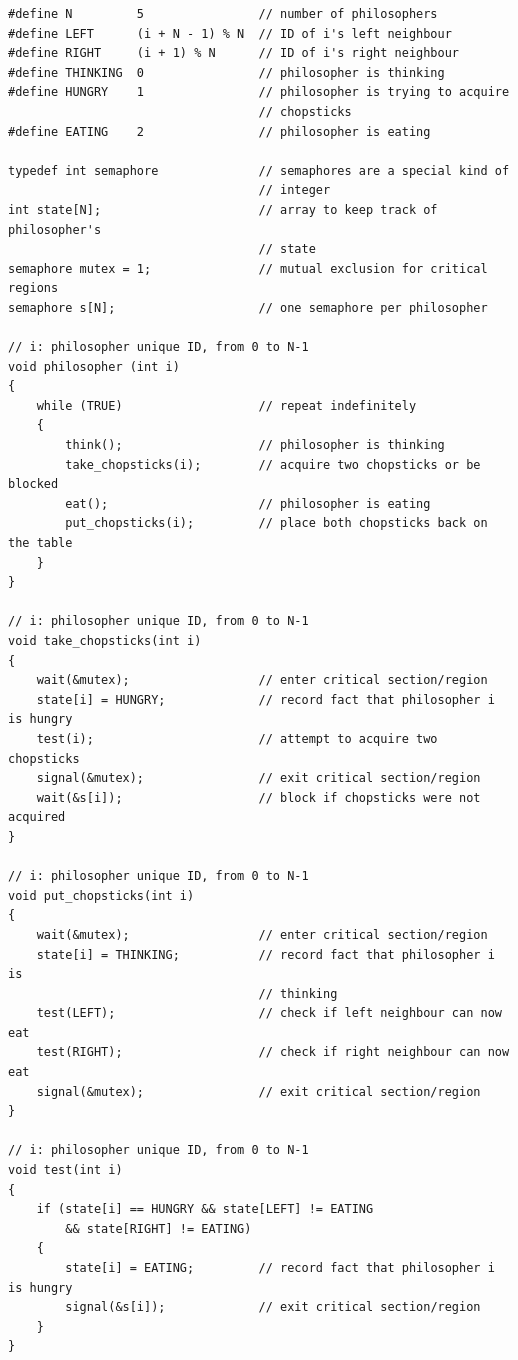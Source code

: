 \documentclass[a4paper]{systems-software}
\begin{document}
\begin{lstlisting}[title={Philosopher class.}]
#define N         5                // number of philosophers
#define LEFT      (i + N - 1) % N  // ID of i's left neighbour
#define RIGHT     (i + 1) % N      // ID of i's right neighbour
#define THINKING  0                // philosopher is thinking
#define HUNGRY    1                // philosopher is trying to acquire
                                   // chopsticks
#define EATING    2                // philosopher is eating

typedef int semaphore              // semaphores are a special kind of
                                   // integer
int state[N];                      // array to keep track of philosopher's
                                   // state             
semaphore mutex = 1;               // mutual exclusion for critical regions
semaphore s[N];                    // one semaphore per philosopher

// i: philosopher unique ID, from 0 to N-1
void philosopher (int i)
{
	while (TRUE)                   // repeat indefinitely
	{
		think();                   // philosopher is thinking
		take_chopsticks(i);        // acquire two chopsticks or be blocked
		eat();                     // philosopher is eating
		put_chopsticks(i);         // place both chopsticks back on the table
	}
}

// i: philosopher unique ID, from 0 to N-1
void take_chopsticks(int i)
{
	wait(&mutex);                  // enter critical section/region
	state[i] = HUNGRY;             // record fact that philosopher i is hungry
	test(i);                       // attempt to acquire two chopsticks
	signal(&mutex);                // exit critical section/region
	wait(&s[i]);                   // block if chopsticks were not acquired
}

// i: philosopher unique ID, from 0 to N-1
void put_chopsticks(int i)
{
	wait(&mutex);                  // enter critical section/region
	state[i] = THINKING;           // record fact that philosopher i is
	                               // thinking
	test(LEFT);                    // check if left neighbour can now eat
	test(RIGHT);                   // check if right neighbour can now eat
	signal(&mutex);                // exit critical section/region
}

// i: philosopher unique ID, from 0 to N-1
void test(int i)
{
	if (state[i] == HUNGRY && state[LEFT] != EATING
		&& state[RIGHT] != EATING)
	{
		state[i] = EATING;         // record fact that philosopher i is hungry
		signal(&s[i]);             // exit critical section/region
	}
}
\end{lstlisting}
\end{document}
